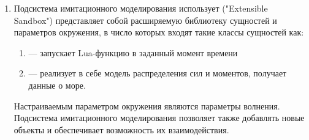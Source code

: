 \begin{enumerate}
	\item
	Подсистема имитационного моделирования использует ("Extensible Sandbox") 
	представляет собой расширяемую библиотеку сущностей и параметров окружения, 
	в число которых входят такие классы сущностей как:
	\begin{enumerate}
		\item	{} --- запускает Lua-функцию в заданный момент времени
		\item	{} --- реализует в себе модель распределения сил 
				и моментов, получает данные о море.
	\end{enumerate}
	Настраиваемым параметром окружения являются параметры волнения.
	Подсистема имитационного моделирования позволяет также добавлять 
			новые объекты и обеспечивает возможность их взаимодействия.
\end{enumerate}


